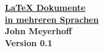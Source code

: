 \begin{titlepage}
    \begin{center}
        \Huge\bfseries\underline{LaTeX Dokumente}\\
        \Huge\bfseries\underline{in mehreren Sprachen}\\
        \vspace{1.5cm}
        {\Large John Meyerhoff}\\
        \vspace{2.5cm}
        {\large Version 0.1}
        \vfill
    \end{center}
\end{titlepage}
